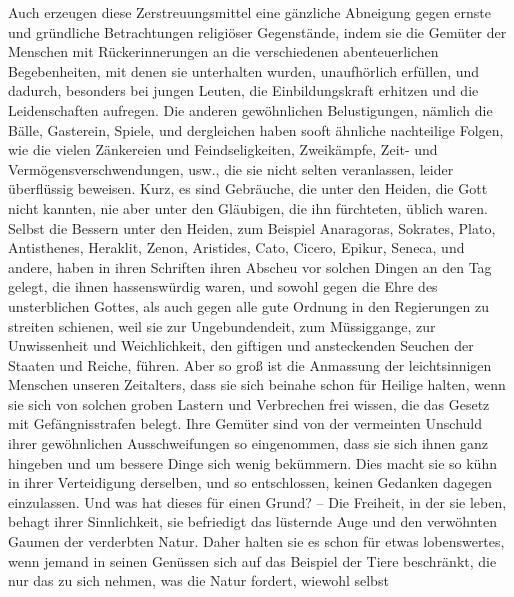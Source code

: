 Auch erzeugen diese Zerstreuungsmittel eine gänzliche Abneigung gegen ernste und
gründliche Betrachtungen religiöser Gegenstände, indem sie die Gemüter der
Menschen mit Rückerinnerungen an die verschiedenen abenteuerlichen
Begebenheiten, mit denen sie unterhalten wurden, unaufhörlich erfüllen, und
dadurch, besonders bei jungen Leuten, die
Einbildungskraft
erhitzen und die
Leidenschaften aufregen. Die anderen gewöhnlichen
Belustigungen, nämlich die
Bälle, Gasterein, Spiele, und dergleichen haben sooft ähnliche nachteilige
Folgen, wie
die vielen Zänkereien und Feindseligkeiten, Zweikämpfe, Zeit- und
Vermögensverschwendungen, usw., die sie nicht selten veranlassen, leider
überflüssig beweisen. Kurz, es sind Gebräuche, die unter den
Heiden, die Gott
nicht kannten, nie aber unter den Gläubigen, die ihn fürchteten, üblich waren.
Selbst die Bessern unter den Heiden, zum Beispiel
Anaragoras, Sokrates, Plato,
Antisthenes, Heraklit,
Zenon, Aristides,
Cato,
Cicero, Epikur,
Seneca, und
andere, haben in ihren Schriften ihren Abscheu vor solchen Dingen an den Tag
gelegt, die ihnen hassenswürdig waren, und sowohl gegen die Ehre des
unsterblichen Gottes, als auch gegen alle gute Ordnung in den
Regierungen zu
streiten schienen, weil sie zur Ungebundendeit, zum Müssiggange, zur
Unwissenheit
und Weichlichkeit, den giftigen und ansteckenden Seuchen der
Staaten und
Reiche,
führen. Aber so groß ist die Anmassung der leichtsinnigen Menschen unseren
Zeitalters, dass sie sich beinahe schon für Heilige halten, wenn sie sich von
solchen groben Lastern und Verbrechen frei wissen, die das Gesetz mit
Gefängnisstrafen belegt. Ihre Gemüter sind von der vermeinten Unschuld ihrer
gewöhnlichen Ausschweifungen so eingenommen, dass sie sich ihnen ganz hingeben
und um bessere Dinge sich wenig bekümmern. Dies macht sie so kühn in ihrer
Verteidigung derselben, und so entschlossen, keinen Gedanken dagegen
einzulassen. Und was hat dieses für einen Grund? -- Die Freiheit, in der sie
leben, behagt ihrer Sinnlichkeit, sie befriedigt das lüsternde Auge und den
verwöhnten Gaumen der verderbten Natur. Daher halten sie es schon für etwas
lobenswertes, wenn jemand in seinen Genüssen sich auf das Beispiel der Tiere
beschränkt, die nur das zu sich nehmen, was die Natur fordert, wiewohl selbst
